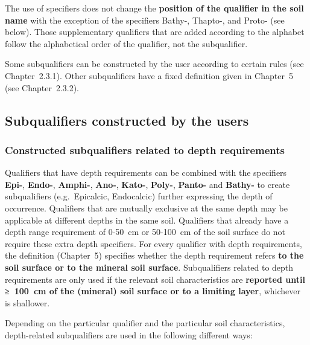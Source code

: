 \documentclass[
  letterpaper,
  DIV=11,
  numbers=noendperiod]{scrreprt}
\begin{document}
The use of specifiers does not change the \textbf{position of the
qualifier in the soil name} with the exception of the specifiers Bathy-,
Thapto-, and Proto- (see below). Those supplementary qualifiers that are
added according to the alphabet follow the alphabetical order of the
qualifier, not the subqualifier.

Some subqualifiers can be constructed by the user according to certain
rules (see Chapter~2.3.1). Other subqualifiers have a fixed definition
given in Chapter~5 (see Chapter~2.3.2).

\hypertarget{subqualifiers-constructed-by-the-users}{%
\subsection{Subqualifiers constructed by the
users}\label{subqualifiers-constructed-by-the-users}}

\hypertarget{constructed-subqualifiers-related-to-depth-requirements}{%
\subsubsection{Constructed subqualifiers related to depth
requirements}\label{constructed-subqualifiers-related-to-depth-requirements}}

Qualifiers that have depth requirements can be combined with the
specifiers \textbf{Epi-}, \textbf{Endo-}, \textbf{Amphi-},
\textbf{Ano-}, \textbf{Kato-}, \textbf{Poly-}, \textbf{Panto-} and
\textbf{Bathy-} to create subqualifiers (e.g.~Epicalcic, Endocalcic)
further expressing the depth of occurrence. Qualifiers that are mutually
exclusive at the same depth may be applicable at different depths in the
same soil. Qualifiers that already have a depth range requirement of
0-50~cm or 50-100~cm of the soil surface do not require these extra
depth specifiers. For every qualifier with depth requirements, the
definition (Chapter~5) specifies whether the depth requirement refers
\textbf{to the soil surface or to the mineral soil surface}.
Subqualifiers related to depth requirements are only used if the
relevant soil characteristics are \textbf{reported until ≥~100~cm of the
(mineral) soil surface or to a limiting layer}, whichever is shallower.

Depending on the particular qualifier and the particular soil
characteristics, depth-related subqualifiers are used in the following
different ways:
\end{document}
